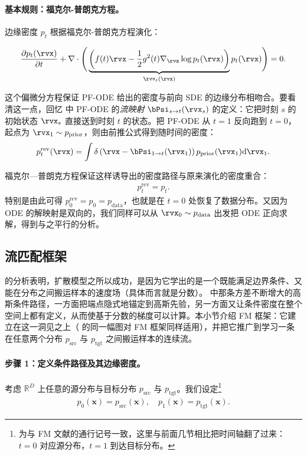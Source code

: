 \paragraph{基本规则：福克尔-普朗克方程。}
边缘密度 $p_t$ 根据福克尔-普朗克方程演化：
\begin{mdframed}
\begin{align*}
    \frac{\partial p_t(\rvx)}{\partial t} + \nabla \cdot \Bigg( \underbrace{\left(f(t)\rvx - \frac{1}{2}g^2(t) \nabla_\rvx \log p_t(\rvx)\right)}_{\rvv_t(\rvx)}  p_t(\rvx) \Bigg) = 0.
\end{align*}
\end{mdframed}
这个偏微分方程保证 PF-ODE 给出的密度与前向 SDE 的边缘分布相吻合。要看清这一点，回忆  中 PF-ODE 的\emph{流映射} $\bPsi_{s \to t}(\rvx_s)$ 的定义：它把时刻 $s$ 的初始状态 $\rvx_s$ 直接送到时刻 $t$ 的状态。把 PF-ODE 从 $t=1$ 反向跑到 $t=0$，起点为 $\rvx_1 \sim p_{\mathrm{prior}}$，则由前推公式得到随时间的密度：
\begin{align}\label{eq:pushforward-ode}
    p_t^{\mathrm{rev}}(\rvx)
    = \int \delta \left(\rvx - \bPsi_{1 \to t}(\rvx_1)\right)
      p_{\mathrm{prior}}(\rvx_1) \mathrm{d}\rvx_1.
\end{align}

福克尔—普朗克方程保证这样诱导出的密度路径与原来演化的密度重合：
\begin{align}\label{eq:p_t-fwd-rev}
p_t^{\mathrm{rev}} = p_t.
\end{align}
特别是由此可得 $p_0^{\mathrm{rev}} = p_0 = p_{\text{data}}$，也就是在 $t=0$ 处恢复了数据分布。又因为 ODE 的解映射是双向的，我们同样可以从 $\rvx_0 \sim p_{\text{data}}$ 出发把 ODE 正向求解，得到与之平行的分析。


\subsection{流匹配框架}\label{subsec:fm-framework}

 的分析表明，扩散模型之所以成功，是因为它学出的是一个既能满足边界条件、又能在分布之间搬运样本的速度场（具体而言就是分数）。 中那条方差不断增大的高斯条件路径，一方面把端点隐式地锚定到高斯先验，另一方面又让条件密度在整个空间上都有定义，从而使基于分数的梯度可以计算。本小节介绍 FM 框架：它建立在这一洞见之上（ 的同一幅图对 FM 框架同样适用），并把它推广到学习一条在任意两个分布 $p_{\text{src}}$ 与 $p_{\text{tgt}}$ 之间搬运样本的连续流。


\paragraph{步骤 1：定义条件路径及其边缘密度。}
考虑 $\mathbb{R}^D$ 上任意的源分布与目标分布 $ p_{\mathrm{src}} $ 与 $ p_{\mathrm{tgt}} $。我们设定\footnote{为与 FM 文献的通行记号一致，这里与前面几节相比把时间轴翻了过来：$t=0$ 对应源分布，$t=1$ 到达目标分布。}
\begin{align}\label{eq:marginal-endpoint}
    p_0(\mathbf{x}) = p_{\mathrm{src}}(\mathbf{x}), \quad p_1(\mathbf{x}) = p_{\mathrm{tgt}}(\mathbf{x}).
\end{align}


